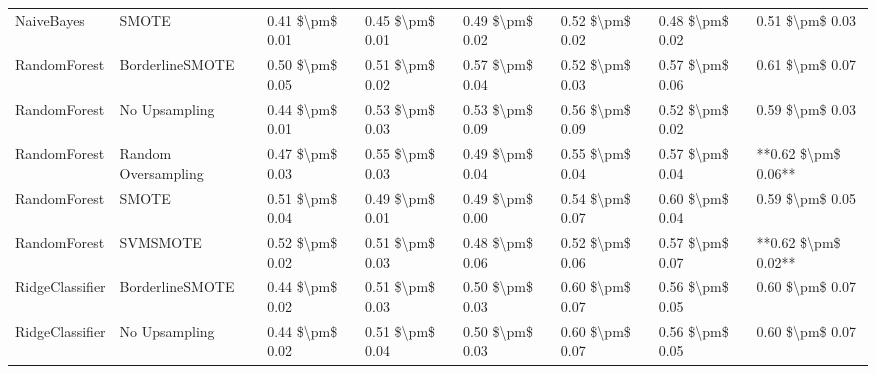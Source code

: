 \begin{tabular}{llllllll}
                     NaiveBayes &                         SMOTE & 0.41 \$\textbackslash pm\$ 0.01 &           0.45 \$\textbackslash pm\$ 0.01 &       0.49 \$\textbackslash pm\$ 0.02 &        0.52 \$\textbackslash pm\$ 0.02 &                         0.48 \$\textbackslash pm\$ 0.02 &     0.51 \$\textbackslash pm\$ 0.03 \\
                   RandomForest &               BorderlineSMOTE & 0.50 \$\textbackslash pm\$ 0.05 &           0.51 \$\textbackslash pm\$ 0.02 &       0.57 \$\textbackslash pm\$ 0.04 &        0.52 \$\textbackslash pm\$ 0.03 &                         0.57 \$\textbackslash pm\$ 0.06 &     0.61 \$\textbackslash pm\$ 0.07 \\
                   RandomForest &                 No Upsampling & 0.44 \$\textbackslash pm\$ 0.01 &           0.53 \$\textbackslash pm\$ 0.03 &       0.53 \$\textbackslash pm\$ 0.09 &        0.56 \$\textbackslash pm\$ 0.09 &                         0.52 \$\textbackslash pm\$ 0.02 &     0.59 \$\textbackslash pm\$ 0.03 \\
                   RandomForest &           Random Oversampling & 0.47 \$\textbackslash pm\$ 0.03 &           0.55 \$\textbackslash pm\$ 0.03 &       0.49 \$\textbackslash pm\$ 0.04 &        0.55 \$\textbackslash pm\$ 0.04 &                         0.57 \$\textbackslash pm\$ 0.04 & **0.62 \$\textbackslash pm\$ 0.06** \\
                   RandomForest &                         SMOTE & 0.51 \$\textbackslash pm\$ 0.04 &           0.49 \$\textbackslash pm\$ 0.01 &       0.49 \$\textbackslash pm\$ 0.00 &        0.54 \$\textbackslash pm\$ 0.07 &                         0.60 \$\textbackslash pm\$ 0.04 &     0.59 \$\textbackslash pm\$ 0.05 \\
                   RandomForest &                      SVMSMOTE & 0.52 \$\textbackslash pm\$ 0.02 &           0.51 \$\textbackslash pm\$ 0.03 &       0.48 \$\textbackslash pm\$ 0.06 &        0.52 \$\textbackslash pm\$ 0.06 &                         0.57 \$\textbackslash pm\$ 0.07 & **0.62 \$\textbackslash pm\$ 0.02** \\
                RidgeClassifier &               BorderlineSMOTE & 0.44 \$\textbackslash pm\$ 0.02 &           0.51 \$\textbackslash pm\$ 0.03 &       0.50 \$\textbackslash pm\$ 0.03 &        0.60 \$\textbackslash pm\$ 0.07 &                         0.56 \$\textbackslash pm\$ 0.05 &     0.60 \$\textbackslash pm\$ 0.07 \\
                RidgeClassifier &                 No Upsampling & 0.44 \$\textbackslash pm\$ 0.02 &           0.51 \$\textbackslash pm\$ 0.04 &       0.50 \$\textbackslash pm\$ 0.03 &        0.60 \$\textbackslash pm\$ 0.07 &                         0.56 \$\textbackslash pm\$ 0.05 &     0.60 \$\textbackslash pm\$ 0.07 \\

\end{tabular}
